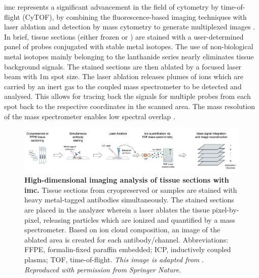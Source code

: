 \par \gls{imc} represents a significant advancement in the field of cytometry by time-of-flight (CyTOF), by combining the fluorescence-based imaging techniques with laser ablation and detection by mass cytometry to generate multiplexed images \textbf{\cite{veenstra_research_2021,chang_imaging_2017}}. In brief, tissue sections (either frozen or ) are stained with a user-determined panel of probes conjugated with stable metal isotopes. The use of non-biological metal isotopes mainly belonging to the lanthanide series nearly eliminates tissue background signals. The stained sections are then ablated by a focused laser beam with 1\textmu m spot size. The laser ablation releases plumes of ions which are carried by an inert gas to the coupled mass spectrometer to be detected and analysed. This allows for tracing back the signals for multiple probes from each spot back to the respective coordinates in the scanned area. The mass resolution of the mass spectrometer enables low spectral overlap \textbf{\cite{veenstra_research_2021,chang_imaging_2017}}.\\

\begin{figure}[t]
    \centering
    \includegraphics[width=\linewidth]{Chapter1/Fig/F1-12-01.png}
    \caption[Overview of Imaging Mass Cytometry workflow]{\textbf{High-dimensional imaging analysis of tissue sections with \gls{imc}.} Tissue sections from cryopreserved or  samples are stained with heavy metal-tagged antibodies simultaneously. The stained sections are placed in the  analyzer wherein a laser ablates the tissue pixel-by-pixel, releasing particles which are ionized and quantified by a mass spectrometer. Based on ion cloud composition, an image of the ablated area is created for each antibody/channel. Abbreviations: FFPE, formalin-fixed paraffin embedded; ICP, inductively coupled plasma; TOF, time-of-flight. \textit{This image is adapted from }\textbf{\cite{damond_map_2019,hartmann_immune_2020}}. \textit{Reproduced with permission from Springer Nature.}}
    \label{fig:chp1_imc_workflow}
\end{figure}

